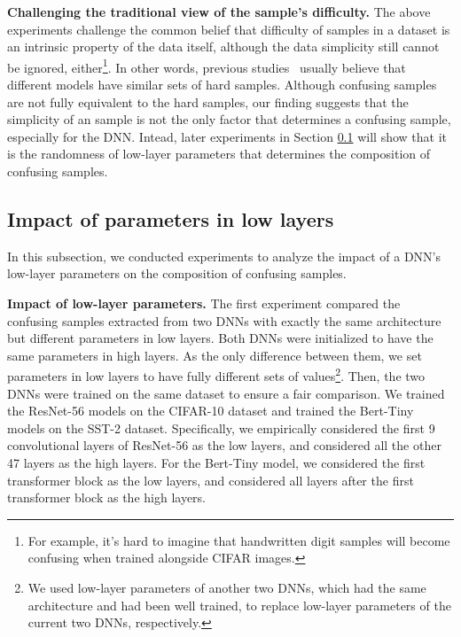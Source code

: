 \documentclass[10pt,twocolumn,letterpaper]{article}
\begin{document}
\textbf{Challenging the traditional view of the sample's difficulty.} The above experiments challenge the common belief that difficulty of samples in a dataset is an intrinsic property of the data itself, although the data simplicity still cannot be ignored, either\footnote[10]{For example, it's hard to imagine that handwritten digit samples will become confusing when trained alongside CIFAR images.}. In other words, previous studies~\cite{forouzesh2024differences} usually believe that different models have similar sets of hard samples.
Although confusing samples are not fully equivalent to the hard samples, our finding suggests that the simplicity of an sample is not the only factor that determines a confusing sample, especially for the DNN. Intead, later experiments in Section \ref{ref::sec4.2} will show that it is the randomness of low-layer parameters that determines the composition of confusing samples.





\subsection{Impact of parameters in low layers}\label{ref::sec4.2}
In this subsection, we conducted experiments to analyze the impact of a DNN's low-layer parameters on the composition of confusing samples.

\textbf{Impact of low-layer parameters.} The first experiment compared the confusing samples extracted from two DNNs with exactly the same architecture but different parameters in low layers. Both DNNs were initialized to have the same parameters in high layers. As the only difference between them, we set parameters in low layers to have fully different sets of values\footnote[11]{\label{ref::fix-setting}We used low-layer parameters of another two DNNs, which had the same architecture and had been well trained, to replace low-layer parameters of the current two DNNs, respectively.}. Then, the two DNNs were trained on the same dataset to ensure a fair comparison. We trained the ResNet-56 models on the CIFAR-10 dataset and trained the Bert-Tiny models on the SST-2 dataset.
Specifically, we empirically considered the first 9 convolutional layers of ResNet-56 as the low layers, and considered all the other 47 layers as the high layers. For the Bert-Tiny model, we considered the first transformer block as the low layers, and considered all layers after the first transformer block as the high layers.
\end{document}

